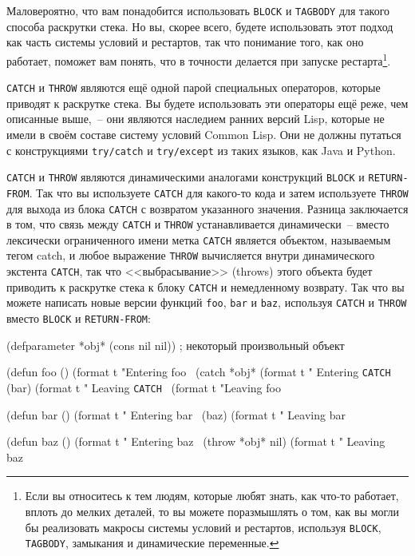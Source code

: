 Маловероятно, что вам понадобится использовать \lstinline{BLOCK} и \lstinline{TAGBODY} для такого
способа раскрутки стека.  Но вы, скорее всего, будете использовать этот подход как часть
системы условий и рестартов, так что понимание того, как оно работает, поможет вам понять,
что в точности делается при запуске рестарта\footnote{Если вы относитесь к тем людям,
  которые любят знать, как что-то работает, вплоть до мелких деталей, то вы можете
  поразмышлять о том, как вы могли бы реализовать макросы системы условий и рестартов,
  используя \lstinline{BLOCK}, \lstinline{TAGBODY}, замыкания и динамические переменные.}.

\lstinline{CATCH} и \lstinline{THROW} являются ещё одной парой специальных операторов, которые
приводят к раскрутке стека.  Вы будете использовать эти операторы ещё реже, чем описанные
выше,~-- они являются наследием ранних версий Lisp, которые не имели в своём составе
систему условий Common Lisp.  Они не должны путаться с конструкциями \lstinline{try/catch} и
\lstinline{try/except} из таких языков, как Java и Python.

\lstinline{CATCH} и \lstinline{THROW} являются динамическими аналогами конструкций \lstinline{BLOCK} и
\lstinline{RETURN-FROM}.  Так что вы используете \lstinline{CATCH} для какого-то кода и затем
используете \lstinline{THROW} для выхода из блока \lstinline{CATCH} с возвратом указанного значения.
Разница заключается в том, что связь между \lstinline{CATCH} и \lstinline{THROW} устанавливается
динамически~-- вместо лексически ограниченного имени метка \lstinline{CATCH} является
объектом, называемым тегом catch, и любое выражение \lstinline{THROW} вычисляется внутри
динамического экстента \lstinline{CATCH}, так что <<выбрасывание>> (throws) этого объекта будет
приводить к раскрутке стека к блоку \lstinline{CATCH} и немедленному возврату.  Так
что вы можете написать новые версии функций \lstinline{foo}, \lstinline{bar} и \lstinline{baz}, используя
\lstinline{CATCH} и \lstinline{THROW} вместо \lstinline{BLOCK} и \lstinline{RETURN-FROM}:

\begin{myverb}
(defparameter *obj* (cons nil nil)) ; некоторый произвольный объект

(defun foo ()
  (format t "Entering foo~%
  (catch *obj*
    (format t " Entering \lstinline{CATCH}~%
    (bar)
    (format t " Leaving \lstinline{CATCH}~%
  (format t "Leaving foo~%

(defun bar ()
  (format t "  Entering bar~%
  (baz)
  (format t "  Leaving bar~%

(defun baz ()
  (format t "   Entering baz~%
  (throw *obj* nil)
  (format t "   Leaving baz~%
\end{myverb}

